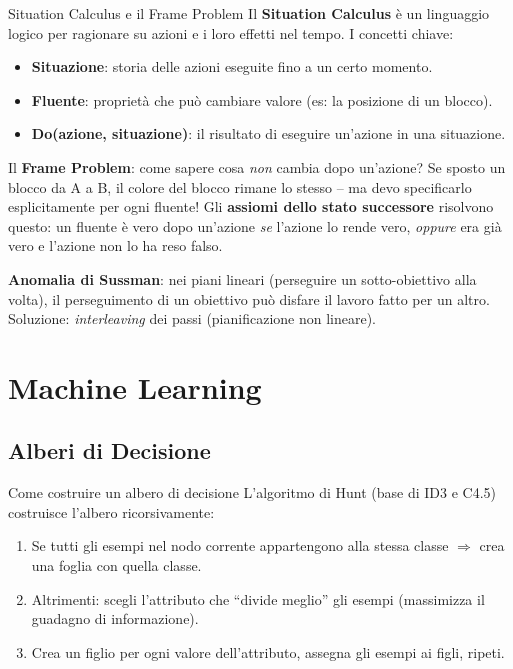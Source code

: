 \documentclass[12pt,a4paper]{article}
\begin{document}
\begin{narrativo}{Situation Calculus e il Frame Problem}
Il \textbf{Situation Calculus} è un linguaggio logico per ragionare su azioni e i loro effetti nel tempo. I concetti chiave:
\begin{itemize}[noitemsep]
  \item \textbf{Situazione}: storia delle azioni eseguite fino a un certo momento.
  \item \textbf{Fluente}: proprietà che può cambiare valore (es: la posizione di un blocco).
  \item \textbf{Do(azione, situazione)}: il risultato di eseguire un'azione in una situazione.
\end{itemize}

Il \textbf{Frame Problem}: come sapere cosa \emph{non} cambia dopo un'azione? Se sposto un blocco da A a B, il colore del blocco rimane lo stesso -- ma devo specificarlo esplicitamente per ogni fluente! Gli \textbf{assiomi dello stato successore} risolvono questo: un fluente è vero dopo un'azione \emph{se} l'azione lo rende vero, \emph{oppure} era già vero e l'azione non lo ha reso falso.

\textbf{Anomalia di Sussman}: nei piani lineari (perseguire un sotto-obiettivo alla volta), il perseguimento di un obiettivo può disfare il lavoro fatto per un altro. Soluzione: \emph{interleaving} dei passi (pianificazione non lineare).
\end{narrativo}

\section{Machine Learning}

\subsection{Alberi di Decisione}

\begin{narrativo}{Come costruire un albero di decisione}
L'algoritmo di Hunt (base di ID3 e C4.5) costruisce l'albero ricorsivamente:
\begin{enumerate}[noitemsep]
  \item Se tutti gli esempi nel nodo corrente appartengono alla stessa classe $\Rightarrow$ crea una foglia con quella classe.
  \item Altrimenti: scegli l'attributo che ``divide meglio'' gli esempi (massimizza il guadagno di informazione).
  \item Crea un figlio per ogni valore dell'attributo, assegna gli esempi ai figli, ripeti.
\end{enumerate}
\end{narrativo}
\end{document}

